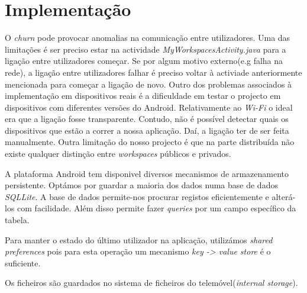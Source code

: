 \section{Implementação}
O \textit{churn} pode provocar anomalias na comunicação entre utilizadores. Uma das limitações é ser preciso estar na actividade \textit{MyWorkspacesActivity.java} para a ligação entre utilizadores começar. Se por algum motivo externo(e.g falha na rede), a ligação entre utilizadores falhar é preciso voltar à activiade anteriormente mencionada para começar a ligação de novo. Outro dos problemas associados à implementação em dispositivos reais é a dificuldade em testar o projecto em dispositivos com diferentes versões do Android. Relativamente ao \textit{Wi-Fi} o ideal era que a ligação fosse transparente. Contudo, não é possível detectar quais os dispositivos que estão a correr a nossa aplicação. Daí, a ligação ter de ser feita manualmente. Outra limitação do nosso projecto é que na parte distribuída não existe qualquer distinção entre \textit{workspaces} públicos e privados.

A plataforma Android tem disponivel diversos mecanismos de armazenamento persistente. Optámos por guardar a maioria dos dados numa base de dados \textit{SQLLite}. A base de dados permite-nos procurar registos eficientemente e alterá-los com facilidade. Além disso permite fazer \textit{queries} por um campo específico da tabela.

Para manter o estado do último utilizador na aplicação, utilizámos \textit{shared preferences} pois para esta operação um mecanismo \textit{key -> value store} é o suficiente.

Os ficheiros são guardados no sistema de ficheiros do telemóvel(\textit{internal storage}). 


